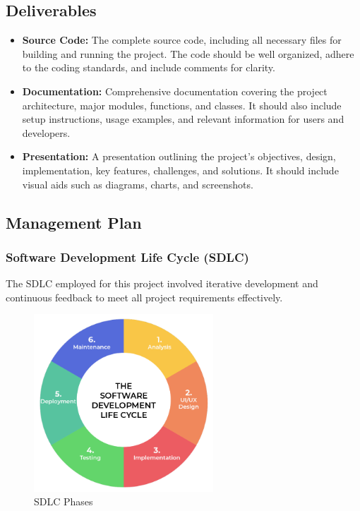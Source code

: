 \subsection{Deliverables}
\begin{itemize}
    \item \textbf{Source Code:} The complete source code, including all necessary files for building and running the project. The code should be well organized, adhere to the coding standards, and include comments for clarity.
    \item \textbf{Documentation:} Comprehensive documentation covering the project architecture, major modules, functions, and classes. It should also include setup instructions, usage examples, and relevant information for users and developers.
    \item \textbf{Presentation:} A presentation outlining the project's objectives, design, implementation, key features, challenges, and solutions. It should include visual aids such as diagrams, charts, and screenshots.
\end{itemize}

\subsection{Management Plan}

\subsubsection{Software Development Life Cycle (SDLC)}
The SDLC employed for this project involved iterative development and continuous feedback to meet all project requirements effectively.
\begin{figure}[h]
  \centering
  \includegraphics[width=0.6\textwidth]{Images/sdlc.png}
  \caption{SDLC Phases}
  \label{fig:SDLC Phases}
\end{figure}

